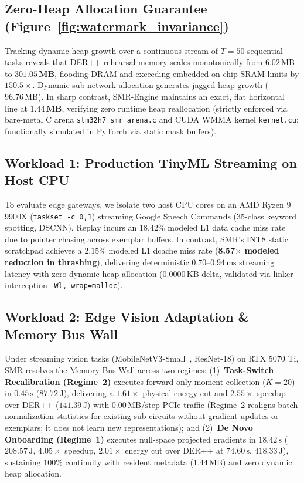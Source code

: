 \documentclass{article}
\begin{document}
\subsection{Zero-Heap Allocation Guarantee (Figure~\ref{fig:watermark_invariance})}
Tracking dynamic heap growth over a continuous stream of $T=50$ sequential tasks reveals that DER++ rehearsal memory scales monotonically from $6.02\,\text{MB}$ to $\mathbf{301.05\,\text{MB}}$, flooding DRAM and exceeding embedded on-chip SRAM limits by $150.5\times$. Dynamic sub-network allocation generates jagged heap growth ($96.76\,\text{MB}$). In sharp contrast, SMR-Engine maintains an exact, flat horizontal line at $\mathbf{1.44\,\text{MB}}$, verifying zero runtime heap reallocation (strictly enforced via bare-metal C arena \texttt{stm32h7\_smr\_arena.c} and CUDA WMMA kernel \texttt{kernel.cu}; functionally simulated in PyTorch via static mask buffers).



\vspace{-2.0mm}
\subsection{Workload 1: Production TinyML Streaming on Host CPU}
To evaluate edge gateways, we isolate two host CPU cores on an AMD Ryzen 9 9900X (\texttt{taskset -c 0,1}) streaming Google Speech Commands (35-class keyword spotting, DSCNN). Replay incurs an $18.42\%$ modeled L1 data cache miss rate due to pointer chasing across exemplar buffers. In contrast, SMR's INT8 static scratchpad achieves a $\mathbf{2.15\%}$ modeled L1 dcache miss rate (\textbf{8.57$\times$ modeled reduction in thrashing}), delivering deterministic $0.70\text{--}0.94\,\text{ms}$ streaming latency with zero dynamic heap allocation ($0.0000\,\text{KB}$ delta, validated via linker interception \texttt{-Wl,--wrap=malloc}).

\vspace{-2.0mm}
\subsection{Workload 2: Edge Vision Adaptation \& Memory Bus Wall}
Under streaming vision tasks (MobileNetV3-Small~\cite{howard2019searching}, ResNet-18) on RTX 5070 Ti, SMR resolves the Memory Bus Wall across two regimes:
(1)~\textbf{Task-Switch Recalibration (Regime~2)} executes forward-only moment collection ($K=20$) in $0.45\,\text{s}$ ($87.72\,\text{J}$), delivering a $1.61\times$ physical energy cut and $2.55\times$ speedup over DER++ ($141.39\,\text{J}$) with $0.00\,\text{MB/step}$ PCIe traffic (Regime~2 realigns batch normalization statistics for existing sub-circuits without gradient updates or exemplars; it does not learn new representations); and
(2)~\textbf{De Novo Onboarding (Regime~1)} executes null-space projected gradients in $18.42\,\text{s}$ ($208.57\,\text{J}$, $4.05\times$ speedup, $2.01\times$ energy cut over DER++ at $74.60\,\text{s}$, $418.33\,\text{J}$), sustaining $100\%$ continuity with resident metadata ($1.44\,\text{MB}$) and zero dynamic heap allocation.
\end{document}
